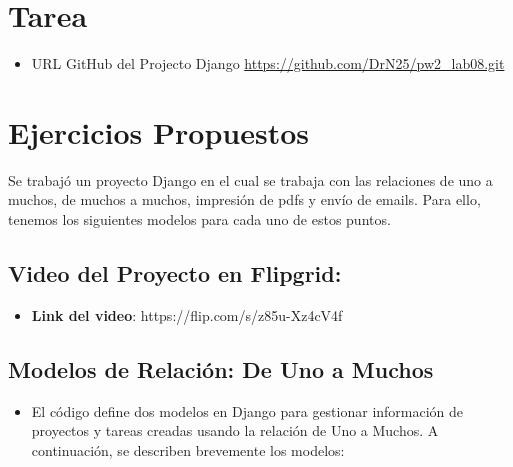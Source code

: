 \documentclass{article}
\begin{document}
	\section{Tarea}
	
\begin{itemize}
    \item URL GitHub del Projecto Django \url{https://github.com/DrN25/pw2\_lab08.git} 
            
\end{itemize}


\section{Ejercicios Propuestos}
Se trabajó un proyecto Django en el cual se trabaja con las relaciones de uno a muchos, de muchos a muchos, impresión de pdfs y envío de emails. Para ello, tenemos los siguientes modelos para cada uno de estos puntos. 

\subsection{Video del Proyecto en Flipgrid:}
\begin{itemize}
    \item \textbf{Link del video}:
    https://flip.com/s/z85u-Xz4cV4f
\end{itemize}

  
\subsection{Modelos de Relación: De Uno a Muchos}
\begin{itemize}
    \item El código define dos modelos en Django para gestionar información de proyectos y tareas creadas usando la relación de Uno a Muchos. A continuación, se describen brevemente los modelos:
\end{itemize}
\end{document}
